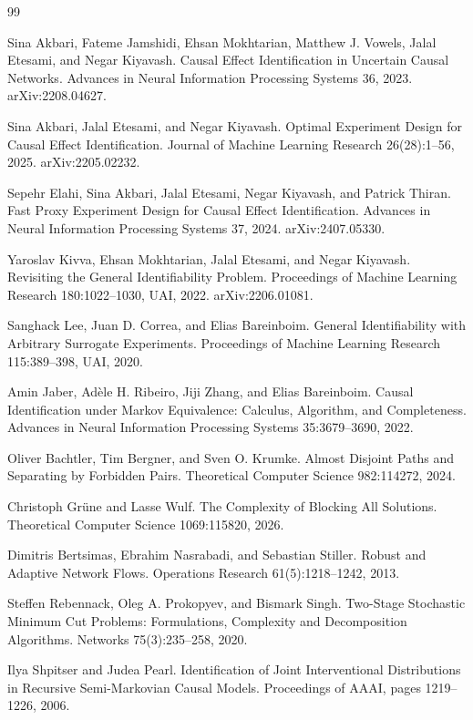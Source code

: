 \documentclass{article}
\begin{document}
\begin{thebibliography}{99}

   Sina Akbari, Fateme Jamshidi, Ehsan Mokhtarian, Matthew J. Vowels, Jalal Etesami, and Negar Kiyavash. Causal Effect Identification in Uncertain Causal Networks. Advances in Neural Information Processing Systems 36, 2023. arXiv:2208.04627.

   Sina Akbari, Jalal Etesami, and Negar Kiyavash. Optimal Experiment Design for Causal Effect Identification. Journal of Machine Learning Research 26(28):1--56, 2025. arXiv:2205.02232.

   Sepehr Elahi, Sina Akbari, Jalal Etesami, Negar Kiyavash, and Patrick Thiran. Fast Proxy Experiment Design for Causal Effect Identification. Advances in Neural Information Processing Systems 37, 2024. arXiv:2407.05330.

   Yaroslav Kivva, Ehsan Mokhtarian, Jalal Etesami, and Negar Kiyavash. Revisiting the General Identifiability Problem. Proceedings of Machine Learning Research 180:1022--1030, UAI, 2022. arXiv:2206.01081.

   Sanghack Lee, Juan D. Correa, and Elias Bareinboim. General Identifiability with Arbitrary Surrogate Experiments. Proceedings of Machine Learning Research 115:389--398, UAI, 2020.

   Amin Jaber, Adèle H. Ribeiro, Jiji Zhang, and Elias Bareinboim. Causal Identification under Markov Equivalence: Calculus, Algorithm, and Completeness. Advances in Neural Information Processing Systems 35:3679--3690, 2022.

   Oliver Bachtler, Tim Bergner, and Sven O. Krumke. Almost Disjoint Paths and Separating by Forbidden Pairs. Theoretical Computer Science 982:114272, 2024.

   Christoph Grüne and Lasse Wulf. The Complexity of Blocking All Solutions. Theoretical Computer Science 1069:115820, 2026.

   Dimitris Bertsimas, Ebrahim Nasrabadi, and Sebastian Stiller. Robust and Adaptive Network Flows. Operations Research 61(5):1218--1242, 2013.

   Steffen Rebennack, Oleg A. Prokopyev, and Bismark Singh. Two-Stage Stochastic Minimum Cut Problems: Formulations, Complexity and Decomposition Algorithms. Networks 75(3):235--258, 2020.

   Ilya Shpitser and Judea Pearl. Identification of Joint Interventional Distributions in Recursive Semi-Markovian Causal Models. Proceedings of AAAI, pages 1219--1226, 2006.

\end{thebibliography}
\end{document}
